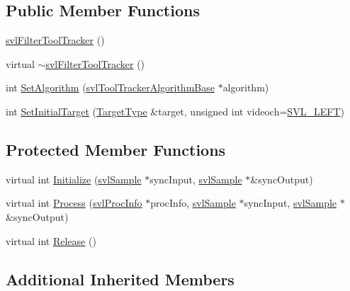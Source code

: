 \subsection*{Public Member Functions}
\begin{DoxyCompactItemize}
\item 
\hyperlink{classsvl_filter_tool_tracker_a442bd4bbe942d63139f1728da7247a30}{svl\-Filter\-Tool\-Tracker} ()
\item 
virtual \hyperlink{classsvl_filter_tool_tracker_a887c017972cd0ca96503fb6c4bd77ed0}{$\sim$svl\-Filter\-Tool\-Tracker} ()
\item 
int \hyperlink{classsvl_filter_tool_tracker_a6deaa24cb8bc7e37f128800e5ce4ac97}{Set\-Algorithm} (\hyperlink{classsvl_tool_tracker_algorithm_base}{svl\-Tool\-Tracker\-Algorithm\-Base} $\ast$algorithm)
\item 
int \hyperlink{classsvl_filter_tool_tracker_a4ce5ff7a3efe30b0347dab41b39dda38}{Set\-Initial\-Target} (\hyperlink{classsvl_filter_tool_tracker_a3fe48b9f9a53caf0f5df9e96b1ccc38e}{Target\-Type} \&target, unsigned int videoch=\hyperlink{svl_definitions_8h_ab9fec7615f19c8df2919eebcab0b187f}{S\-V\-L\-\_\-\-L\-E\-F\-T})
\end{DoxyCompactItemize}
\subsection*{Protected Member Functions}
\begin{DoxyCompactItemize}
\item 
virtual int \hyperlink{classsvl_filter_tool_tracker_ad71ff49f9538f8f34ef57deb1d8f34a6}{Initialize} (\hyperlink{classsvl_sample}{svl\-Sample} $\ast$sync\-Input, \hyperlink{classsvl_sample}{svl\-Sample} $\ast$\&sync\-Output)
\item 
virtual int \hyperlink{classsvl_filter_tool_tracker_a33c461cf76f3c09f50493a98bdb9dd6e}{Process} (\hyperlink{structsvl_proc_info}{svl\-Proc\-Info} $\ast$proc\-Info, \hyperlink{classsvl_sample}{svl\-Sample} $\ast$sync\-Input, \hyperlink{classsvl_sample}{svl\-Sample} $\ast$\&sync\-Output)
\item 
virtual int \hyperlink{classsvl_filter_tool_tracker_aec6f87e6e3d575fd0f990a0c4c66269f}{Release} ()
\end{DoxyCompactItemize}
\subsection*{Additional Inherited Members}


